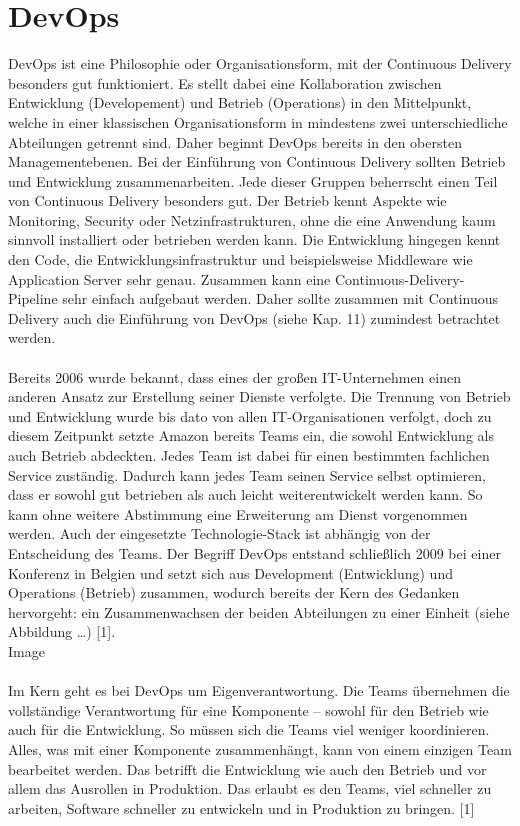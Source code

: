 \section{DevOps}
DevOps ist eine Philosophie oder Organisationsform, mit der Continuous Delivery besonders gut funktioniert. Es stellt dabei eine Kollaboration zwischen Entwicklung (Developement) und Betrieb (Operations) in den Mittelpunkt, welche in einer klassischen Organisationsform in mindestens zwei unterschiedliche Abteilungen getrennt sind. Daher beginnt DevOps bereits in den obersten Managementebenen. 
Bei der Einführung von Continuous Delivery sollten Betrieb und Entwicklung zusammenarbeiten. Jede dieser Gruppen beherrscht einen Teil von Continuous Delivery besonders gut. Der Betrieb kennt Aspekte wie Monitoring, Security oder Netzinfrastrukturen, ohne die eine Anwendung kaum sinnvoll installiert oder betrieben werden kann. Die Entwicklung hingegen kennt den Code, die Entwicklungsinfrastruktur und beispielsweise Middleware wie Application Server sehr genau. Zusammen kann eine Continuous-Delivery-Pipeline sehr einfach aufgebaut werden. Daher sollte zusammen mit Continuous Delivery auch die Einführung von DevOps (siehe Kap. 11) zumindest betrachtet werden.\\ \\
Bereits 2006 wurde bekannt, dass eines der großen IT-Unternehmen einen anderen Ansatz zur Erstellung seiner Dienste verfolgte. Die Trennung von Betrieb und Entwicklung wurde bis dato von allen IT-Organisationen verfolgt, doch zu diesem Zeitpunkt setzte Amazon bereits Teams ein, die sowohl Entwicklung als auch Betrieb abdeckten. Jedes Team ist dabei für einen bestimmten fachlichen Service zuständig. Dadurch kann jedes Team seinen Service selbst optimieren, dass er sowohl gut betrieben als auch leicht weiterentwickelt werden kann. So kann ohne weitere Abstimmung eine Erweiterung am Dienst vorgenommen werden. Auch der eingesetzte Technologie-Stack ist abhängig von der Entscheidung des Teams. Der Begriff DevOps entstand schließlich 2009 bei einer Konferenz in Belgien und setzt sich aus Development (Entwicklung) und Operations (Betrieb) zusammen, wodurch bereits der Kern des Gedanken hervorgeht: ein Zusammenwachsen der beiden Abteilungen zu einer Einheit (siehe Abbildung …) [1]. \\
Image\\ \\
Im Kern geht es bei DevOps um Eigenverantwortung. Die Teams übernehmen die vollständige Verantwortung für eine Komponente – sowohl für den Betrieb wie auch für die Entwicklung. So müssen sich die Teams viel weniger koordinieren. Alles, was mit einer Komponente zusammenhängt, kann von einem einzigen Team bearbeitet werden. Das betrifft die Entwicklung wie auch den Betrieb und vor allem das Ausrollen in Produktion. Das erlaubt es den Teams, viel schneller zu arbeiten, Software schneller zu entwickeln und in Produktion zu bringen. [1]
